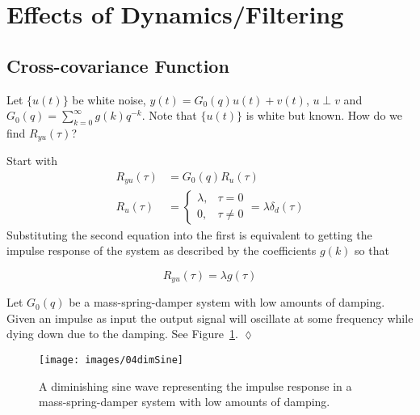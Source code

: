 \section{Effects of Dynamics/Filtering}
\subsection{Cross-covariance Function}
Let $\{u(t)\}$ be white noise, $y(t)=G_0(q)u(t)+v(t)$, $u\perp v$ and $G_0(q)=\sum_{k=0}^\infty g(k)q^{-k}$.
Note that $\{u(t)\}$ is white but known.
How do we find $R_{yu}(\tau)$?

Start with
\begin{align*}
R_{yu}(\tau) &= G_0(q)R_u(\tau) \\
R_u(\tau) &= \begin{cases} \lambda, & \tau=0 \\ 0, & \tau\neq 0 \end{cases} = \lambda\delta_d(\tau)
\end{align*}
Substituting the second equation into the first is equivalent to getting the impulse response of the system as described by the coefficients $g(k)$ so that

\begin{equation*}
R_{yu}(\tau) = \lambda g(\tau)
\end{equation*}

\begin{example}
Let $G_0(q)$ be a mass-spring-damper system with low amounts of damping.
Given an impulse as input the output signal will oscillate at some frequency while dying down due to the damping.
See Figure~\ref{fig:04dimSine}.
$\lozenge$
\end{example}
\begin{figure}[ht!]
\centering
\texttt{[image: images/04dimSine]}
\caption{A diminishing sine wave representing the impulse response in a mass-spring-damper system with low amounts of damping.}%
\label{fig:04dimSine}
\end{figure}

